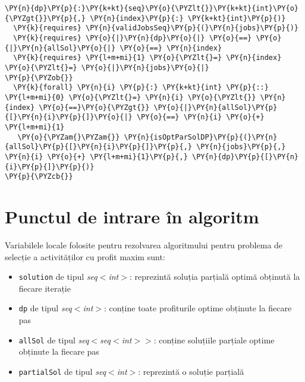 \begin{itemize}
\begin{Verbatim}[commandchars=\\\{\}, fontsize=\footnotesize]
 \PY{n}{dp}\PY{p}{:}\PY{k+kt}{seq}\PY{o}{\PYZlt{}}\PY{k+kt}{int}\PY{o}{\PYZgt{}}\PY{p}{,} \PY{n}{index}\PY{p}{:} \PY{k+kt}{int}\PY{p}{)}
  \PY{k}{requires} \PY{n}{validJobsSeq}\PY{p}{(}\PY{n}{jobs}\PY{p}{)}
  \PY{k}{requires} \PY{o}{|}\PY{n}{dp}\PY{o}{|} \PY{o}{==} \PY{o}{|}\PY{n}{allSol}\PY{o}{|} \PY{o}{==} \PY{n}{index}
  \PY{k}{requires} \PY{l+m+mi}{1} \PY{o}{\PYZlt{}=} \PY{n}{index} \PY{o}{\PYZlt{}=} \PY{o}{|}\PY{n}{jobs}\PY{o}{|}
\PY{p}{\PYZob{}}
  \PY{k}{forall} \PY{n}{i} \PY{p}{:} \PY{k+kt}{int} \PY{p}{::} \PY{l+m+mi}{0} \PY{o}{\PYZlt{}=} \PY{n}{i} \PY{o}{\PYZlt{}} \PY{n}{index} \PY{o}{==}\PY{o}{\PYZgt{}} \PY{o}{|}\PY{n}{allSol}\PY{p}{[}\PY{n}{i}\PY{p}{]}\PY{o}{|} \PY{o}{==} \PY{n}{i} \PY{o}{+} \PY{l+m+mi}{1} 
   \PY{o}{\PYZam{}\PYZam{}} \PY{n}{isOptParSolDP}\PY{p}{(}\PY{n}{allSol}\PY{p}{[}\PY{n}{i}\PY{p}{]}\PY{p}{,} \PY{n}{jobs}\PY{p}{,} \PY{n}{i} \PY{o}{+} \PY{l+m+mi}{1}\PY{p}{,} \PY{n}{dp}\PY{p}{[}\PY{n}{i}\PY{p}{]}\PY{p}{)}
\PY{p}{\PYZcb{}}
\end{Verbatim}

\end{itemize}

\section{Punctul de intrare în algoritm}
Variabilele locale folosite pentru rezolvarea algoritmului pentru problema de selecție a activităților cu profit maxim sunt:
\begin{itemize}
    \item \texttt{solution} de tipul \textit{seq$<$int$>$}: reprezintă soluția parțială optimă obținută la fiecare iterație
    \item \texttt{dp} de tipul \textit{seq$<$int$>$}:
    conține toate profiturile optime obținute la fiecare pas
    \item \texttt{allSol} de tipul \textit{seq$<$seq$<$int$>$$>$}:
    conține soluțiile parțiale optime obținute la fiecare pas
    \item \texttt{partialSol} de tipul \textit{seq$<$int$>$}: reprezintă o soluție parțială   
\end{itemize}

